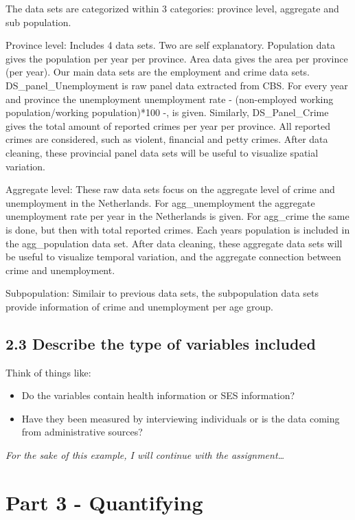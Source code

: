 \documentclass[
]{article}
\begin{document}
The data sets are categorized within 3 categories: province level,
aggregate and sub population.

Province level: Includes 4 data sets. Two are self explanatory.
Population data gives the population per year per province. Area data
gives the area per province (per year). Our main data sets are the
employment and crime data sets. DS\_panel\_Unemployment is raw panel
data extracted from CBS. For every year and province the unemployment
unemployment rate - (non-employed working population/working
population)*100 -, is given. Similarly, DS\_Panel\_Crime gives the total
amount of reported crimes per year per province. All reported crimes are
considered, such as violent, financial and petty crimes. After data
cleaning, these provincial panel data sets will be useful to visualize
spatial variation.

Aggregate level: These raw data sets focus on the aggregate level of
crime and unemployment in the Netherlands. For agg\_unemployment the
aggregate unemployment rate per year in the Netherlands is given. For
agg\_crime the same is done, but then with total reported crimes. Each
years population is included in the agg\_population data set. After data
cleaning, these aggregate data sets will be useful to visualize temporal
variation, and the aggregate connection between crime and unemployment.

Subpopulation: Similair to previous data sets, the subpopulation data
sets provide information of crime and unemployment per age group.

\subsection{2.3 Describe the type of variables
included}\label{describe-the-type-of-variables-included}

Think of things like:

\begin{itemize}
\item
  Do the variables contain health information or SES information?
\item
  Have they been measured by interviewing individuals or is the data
  coming from administrative sources?
\end{itemize}

\emph{For the sake of this example, I will continue with the
assignment\ldots{}}

\section{Part 3 - Quantifying}\label{part-3---quantifying}
\end{document}
